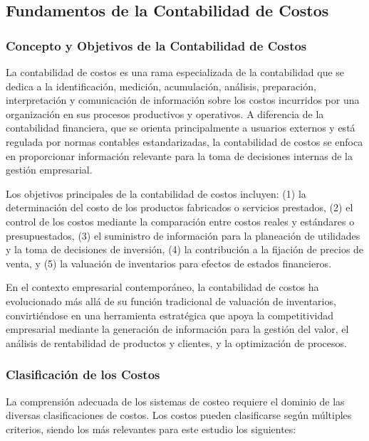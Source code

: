 \documentclass[
  stu,
  floatsintext,
  longtable,
  a4paper,
  nolmodern,
  notxfonts,
  notimes,
  12pt,
  colorlinks=true,linkcolor=blue,citecolor=blue,urlcolor=blue]{apa7}
\begin{document}
\subsection{Fundamentos de la Contabilidad de
Costos}\label{fundamentos-de-la-contabilidad-de-costos}

\subsubsection{Concepto y Objetivos de la Contabilidad de
Costos}\label{concepto-y-objetivos-de-la-contabilidad-de-costos}

La contabilidad de costos es una rama especializada de la contabilidad
que se dedica a la identificación, medición, acumulación, análisis,
preparación, interpretación y comunicación de información sobre los
costos incurridos por una organización en sus procesos productivos y
operativos. A diferencia de la contabilidad financiera, que se orienta
principalmente a usuarios externos y está regulada por normas contables
estandarizadas, la contabilidad de costos se enfoca en proporcionar
información relevante para la toma de decisiones internas de la gestión
empresarial.

Los objetivos principales de la contabilidad de costos incluyen: (1) la
determinación del costo de los productos fabricados o servicios
prestados, (2) el control de los costos mediante la comparación entre
costos reales y estándares o presupuestados, (3) el suministro de
información para la planeación de utilidades y la toma de decisiones de
inversión, (4) la contribución a la fijación de precios de venta, y (5)
la valuación de inventarios para efectos de estados financieros.

En el contexto empresarial contemporáneo, la contabilidad de costos ha
evolucionado más allá de su función tradicional de valuación de
inventarios, convirtiéndose en una herramienta estratégica que apoya la
competitividad empresarial mediante la generación de información para la
gestión del valor, el análisis de rentabilidad de productos y clientes,
y la optimización de procesos.

\subsubsection{Clasificación de los
Costos}\label{clasificaciuxf3n-de-los-costos}

La comprensión adecuada de los sistemas de costeo requiere el dominio de
las diversas clasificaciones de costos. Los costos pueden clasificarse
según múltiples criterios, siendo los más relevantes para este estudio
los siguientes:
\end{document}
